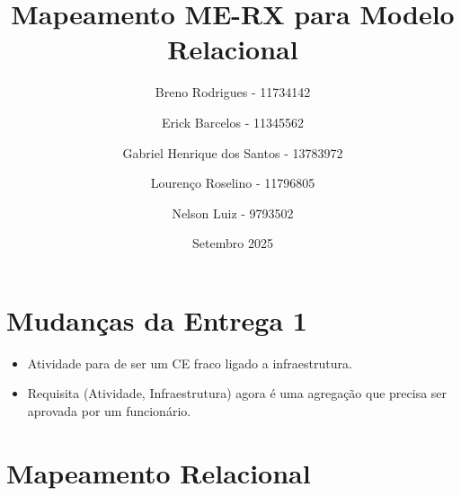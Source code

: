 \documentclass{article}
\title{Mapeamento ME-RX para Modelo Relacional}
\author{Breno Rodrigues - 11734142 \and Erick Barcelos - 11345562 \and Gabriel Henrique dos Santos - 13783972 \and Lourenço Roselino - 11796805 \and Nelson Luiz - 9793502}
\date{Setembro 2025}
\begin{document}
\maketitle

\section*{Mudanças da Entrega 1}
\begin{itemize}
    \item Atividade para de ser um CE fraco ligado a infraestrutura.
    \item Requisita (Atividade, Infraestrutura) agora é uma agregação que precisa ser aprovada por um funcionário.
\end{itemize}

\section*{Mapeamento Relacional}
\end{document}
